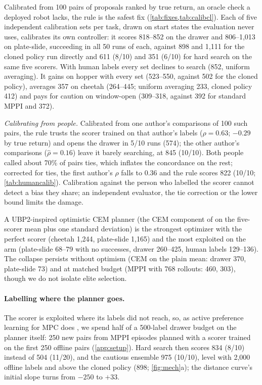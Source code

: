 \documentclass{article}
\theoremstyle{plain}
\theoremstyle{remark}
\begin{document}
Calibrated from 100 pairs of proposals ranked by true return, an oracle check a deployed robot lacks, the rule is the
safest fix (\cref{tab:fixes,tab:calibcl}).
Each of five independent calibration sets per task, drawn on start states the evaluation never uses, calibrates its
own controller: it scores 818--852 on the drawer and 806--1,013 on plate-slide, succeeding in all 50 runs of each,
against 898 and 1,111 for the cloned policy run directly and 611 (8/10) and 351 (6/10) for hard search on the same five
scorers. With human labels every set declines to search (852, uniform averaging). It gains on hopper with every set
(523--550, against 502 for the cloned policy), averages 357 on cheetah (264--445; uniform averaging 233, cloned policy
412) and pays for caution on window-open (309--318, against 392 for standard MPPI and 372).

\emph{Calibrating from people.} Calibrated from one author's comparisons of 100 such pairs, the rule trusts the scorer trained on that author's labels ($\hat\rho=0.63$; $-0.29$ by true return)
and opens the drawer in 5/10 runs (574); the other author's comparisons ($\hat\rho=0.16$) leave it barely searching, at
845 (10/10). Both people called about 70\% of pairs ties, which inflates the concordance on the rest; corrected for
ties, the first author's $\hat\rho$ falls to 0.36 and the rule scores 822 (10/10; \cref{tab:humancalib}). Calibration
against the person who labelled the scorer cannot detect a bias they share; an independent evaluator, the tie
correction or the lower bound limits the damage.

A UBP2-inspired optimistic CEM planner (the CEM component of \citet{nabail2026ubp2} on the five-scorer mean plus one
standard deviation) is the strongest optimizer with the perfect scorer (cheetah 1,244,
plate-slide 1,165) and the most exploited on the arm (plate-slide 68--79 with no successes, drawer 260--425, human
labels 129--136). The collapse persists without optimism (CEM on the plain mean: drawer 370,
plate-slide 73) and at matched budget (MPPI with 768 rollouts: 460, 303), though we do not isolate elite selection.

\paragraph{Labelling where the planner goes.} The scorer is exploited where its labels did not reach, so, as active preference learning
for MPC does \citep{elhasnaouy2026active}, we spend half of a 500-label drawer budget on the planner itself: 250 new
pairs from MPPI episodes planned with a scorer trained on the first 250 offline pairs (\cref{app:setup}). Hard search
then scores 834 (8/10) instead of 504 (11/20), and the cautious ensemble 975 (10/10), level with 2,000 offline labels
and above the cloned policy (898; \cref{fig:mech}a); the distance curve's initial slope turns from $-250$ to $+33$.
\end{document}
